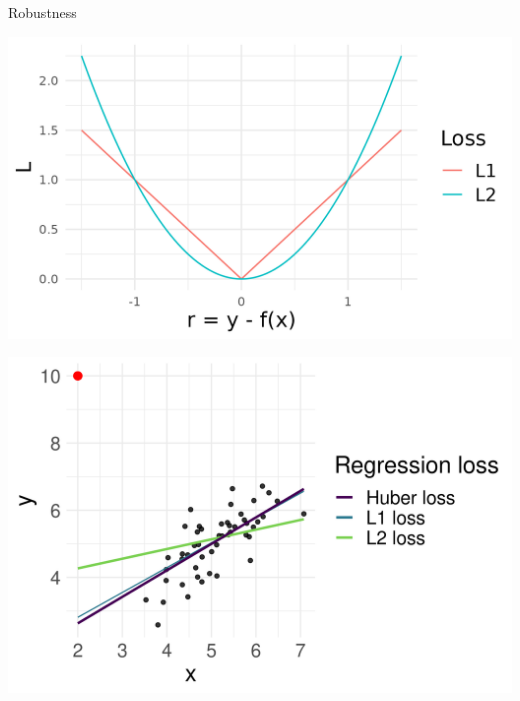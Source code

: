 \documentclass[11pt,compress,t,notes=noshow, xcolor=table]{beamer}
\begin{document}
\begin{vbframe}{Robustness}
\begin{minipage}[c]{0.05\textwidth}
  \phantom{foo}
\end{minipage}%
\begin{minipage}[c]{0.45\textwidth}
  \includegraphics[width=\textwidth]{figure/loss_l1_l2}
  \footnotesize \centering
\end{minipage}%
\begin{minipage}[c]{0.05\textwidth}
  \phantom{foo}
\end{minipage}%
\begin{minipage}[c]{0.45\textwidth}
\includegraphics[width=\textwidth]{figure/robustness}
\end{minipage}%

% 
% 

\end{vbframe}
\end{document}
